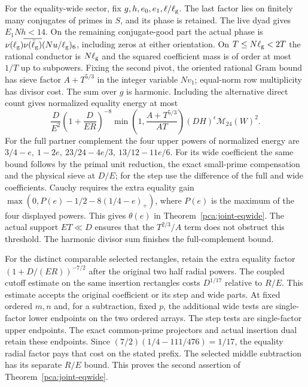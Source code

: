For the equality-wide sector, fix \(g,h,e_0,e_1,\ell/\ell_{\rm g}\).
The last factor lies on finitely many conjugates of primes
in \(S\), and its phase is retained.
The live dyad gives \(E_1Nh<14\).
On the remaining conjugate-good part the actual phase is
\(\nu(\ell_{\rm g})\overline{\nu(\bar\ell_{\rm g})}
 (Nu/\ell_{\rm g})_6\), including zeros at either orientation.
On \(T\le N\ell_{\rm g}<2T\) the rational conductor is
\(N\ell_{\rm g}\) and the squared coefficient mass is
of order at most \(1/T\) up to subpowers. Fixing the
second pivot, the oriented rational Gram bound has sieve
factor \(A+T^{5/3}\) in the integer variable \(Nv_1\);
equal-norm row multiplicity has divisor cost.
The sum over \(g\) is harmonic. Including the alternative
direct count gives normalized equality energy at most
\[
 \frac{D}{E^2}\left(1+\frac{D}{ER}\right)^{-8}
      \min\left(1,\frac{A+T^{5/3}}{AT}\right)
       (DH)^\epsilon\mathcal M_{24}(W)^2.
\]
For the full partner complement the four upper powers
of normalized energy are
\(3/4-e,\ 1-2e,\ 23/24-4e/3,\ 13/12-11e/6\).
For its wide coefficient the same bound follows by the
primal unit reduction, the exact small-prime compensation
and the physical sieve at \(D/E\); for the step use the
difference of the full and wide coefficients.
Cauchy requires the extra equality gain
\(\max(0,P(e)-1/2-8(1/4-e)_+)\), where \(P(e)\) is the
maximum of the four displayed powers.
This gives \(\theta(e)\) in Theorem~\ref{pca:joint-eqwide}.
The actual support \(ET\ll D\) ensures that the
\(T^{2/3}/A\) term does not obstruct this threshold.
The harmonic divisor sum finishes the full-complement bound.

For the distinct comparable selected rectangles, retain
the extra equality factor \((1+D/(ER))^{-7/2}\) after the
original two half radial powers. The coupled cutoff estimate
on the same insertion rectangles costs \(D^{1/17}\)
relative to \(R/E\). This estimate accepts the original
coefficient or its step and wide parts. At fixed ordered
\(m,n\) and, for a subtraction, fixed \(p\), the additional
wide tests are single-factor lower endpoints on the two
ordered arrays. The step tests are single-factor upper
endpoints. The exact common-prime projectors and actual
insertion dual retain these endpoints. Since
\((7/2)(1/4-111/476)=1/17\), the equality radial factor pays
that cost on the stated prefix. The selected middle subtraction
has its separate \(R/E\) bound. This proves the second
assertion of Theorem~\ref{pca:joint-eqwide}.
